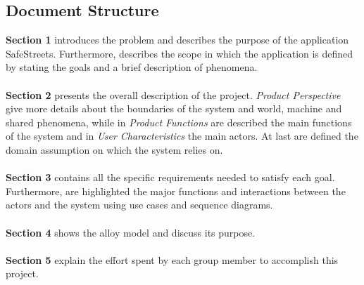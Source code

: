 \subsection{Document
Structure}

\textbf{Section 1} introduces the problem and describes the purpose of the application SafeStreets. Furthermore, describes the scope in which the application is defined by stating the goals and a brief description of phenomena.\\\\
\textbf{Section 2} presents the overall description of the project. \textit{Product Perspective} give more details about the boundaries of the system and world, machine and shared phenomena, while in \textit{Product Functions} are described the main functions of the system and in \textit{User Characteristics} the main actors. At last are defined the domain assumption on which the system relies on.\\\\
\textbf{Section 3} contains all the specific requirements needed to satisfy each goal. Furthermore, are highlighted the major functions and interactions between the actors and the system using use cases and sequence diagrams.\\\\
\textbf{Section 4} shows the alloy model and discuss its purpose.\\\\
\textbf{Section 5} explain the effort spent by each group member to accomplish this project.\\